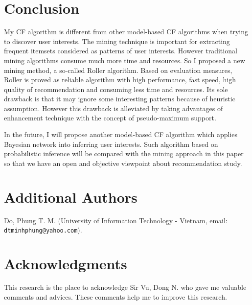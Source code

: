 \documentclass{article}
\begin{document}
\section{Conclusion} \label{section:conclusion}
My CF algorithm is different from other model-based CF algorithms when trying to discover user interests. The mining technique is important for extracting frequent itemsets considered as patterns of user interests. However traditional mining algorithms consume much more time and resources. So I proposed a new mining method, a so-called Roller algorithm. Based on evaluation measures, Roller is proved as reliable algorithm with high performance, fast speed, high quality of recommendation and consuming less time and resources. Its sole drawback is that it may ignore some interesting patterns because of heuristic assumption. However this drawback is alleviated by taking advantages of enhancement technique with the concept of pseudo-maximum support.

In the future, I will propose another model-based CF algorithm which applies Bayesian network into inferring user interests. Such algorithm based on probabilistic inference will be compared with the mining approach in this paper so that we have an open and objective viewpoint about recommendation study.

\section*{Additional Authors}
Do, Phung T. M. (University of Information Technology - Vietnam, email: \texttt{dtminhphung@yahoo.com}).

\section*{Acknowledgments}
This research is the place to acknowledge Sir Vu, Dong N. who gave me valuable comments and advices. These comments help me to improve this research.



\end{document}
